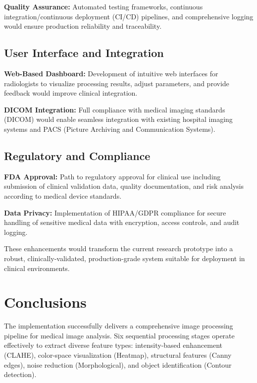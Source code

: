 \documentclass[12pt,a4paper]{article}
\begin{document}
\textbf{Quality Assurance:} Automated testing frameworks, continuous integration/continuous deployment (CI/CD) pipelines, and comprehensive logging would ensure production reliability and traceability.

\subsection{User Interface and Integration}

\textbf{Web-Based Dashboard:} Development of intuitive web interfaces for radiologists to visualize processing results, adjust parameters, and provide feedback would improve clinical integration.

\textbf{DICOM Integration:} Full compliance with medical imaging standards (DICOM) would enable seamless integration with existing hospital imaging systems and PACS (Picture Archiving and Communication Systems).

\subsection{Regulatory and Compliance}

\textbf{FDA Approval:} Path to regulatory approval for clinical use including submission of clinical validation data, quality documentation, and risk analysis according to medical device standards.

\textbf{Data Privacy:} Implementation of HIPAA/GDPR compliance for secure handling of sensitive medical data with encryption, access controls, and audit logging.

These enhancements would transform the current research prototype into a robust, clinically-validated, production-grade system suitable for deployment in clinical environments.

\newpage

\section{Conclusions}

The implementation successfully delivers a comprehensive image processing pipeline for medical image analysis. Six sequential processing stages operate effectively to extract diverse feature types: intensity-based enhancement (CLAHE), color-space visualization (Heatmap), structural features (Canny edges), noise reduction (Morphological), and object identification (Contour detection).
\end{document}
